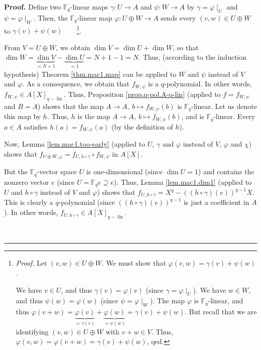 \documentclass[numbers=enddot,12pt,final,onecolumn,notitlepage]{scrartcl}%
\theoremstyle{definition}
\newenvironment{proof}[1][Proof]{\noindent\textbf{#1.} }{\ \rule{0.5em}{0.5em}}
\begin{document}
\begin{proof}
Define two $\mathbb{F}_{q}$-linear maps $\gamma:U\rightarrow A$ and
$\psi:W\rightarrow A$ by $\gamma=\varphi\mid_{U}$ and $\psi=\varphi\mid_{W}$.
Then, the $\mathbb{F}_{q}$-linear map $\varphi:U\oplus W\rightarrow A$ sends
every $\left(  v,w\right)  \in U\oplus W$ to $\gamma\left(  v\right)
+\psi\left(  w\right)  $\ \ \ \ \footnote{\textit{Proof.} Let $\left(
v,w\right)  \in U\oplus W$. We must show that $\varphi\left(  v,w\right)
=\gamma\left(  v\right)  +\psi\left(  w\right)  $.
\par
We have $v\in U$, and thus $\gamma\left(  v\right)  =\varphi\left(  v\right)
$ (since $\gamma=\varphi\mid_{U}$). We have $w\in W$, and thus $\psi\left(
w\right)  =\varphi\left(  w\right)  $ (since $\psi=\varphi\mid_{W}$). The map
$\varphi$ is $\mathbb{F}_{q}$-linear, and thus $\varphi\left(  v+w\right)
=\underbrace{\varphi\left(  v\right)  }_{=\gamma\left(  v\right)
}+\underbrace{\varphi\left(  w\right)  }_{=\psi\left(  w\right)  }%
=\gamma\left(  v\right)  +\psi\left(  w\right)  $. But recall that we are
identifying $\left(  v,w\right)  \in U\oplus W$ with $v+w\in V$. Thus,
$\varphi\left(  v,w\right)  =\varphi\left(  v+w\right)  =\gamma\left(
v\right)  +\psi\left(  w\right)  $, qed.}.

From $V=U\oplus W$, we obtain $\dim V=\dim U+\dim W$, so that $\dim
W=\underbrace{\dim V}_{=N+1}-\underbrace{\dim U}_{=1}=N+1-1=N$. Thus,
(according to the induction hypothesis) Theorem \ref{thm.mac1.map} can be
applied to $W$ and $\psi$ instead of $V$ and $\varphi$. As a consequence, we
obtain that $f_{W,\psi}$ is a $q$-polynomial. In other words, $f_{W,\psi}\in
A\left[  X\right]  _{q-\operatorname*{lin}}$. Thus, Proposition
\ref{prop.q-pol.A-q-lin} (applied to $f=f_{W,\psi}$ and $B=A$) shows that the
map $A\rightarrow A,\ b\mapsto f_{W,\psi}\left(  b\right)  $ is $\mathbb{F}%
_{q}$-linear. Let us denote this map by $h$. Thus, $h$ is the map
$A\rightarrow A,\ b\mapsto f_{W,\psi}\left(  b\right)  $, and is
$\mathbb{F}_{q}$-linear. Every $a\in A$ satisfies $h\left(  a\right)
=f_{W,\psi}\left(  a\right)  $ (by the definition of $h$).

Now, Lemma \ref{lem.mac1.too-early} (applied to $U$, $\gamma$ and $\varphi$
instead of $V$, $\varphi$ and $\chi$) shows that $f_{U\oplus W,\varphi
}=f_{U,h\circ\gamma}\circ f_{W,\psi}$ in $A\left[  X\right]  $.

But the $\mathbb{F}_{q}$-vector space $U$ is one-dimensional (since $\dim
U=1$) and contains the nonzero vector $e$ (since $U=\mathbb{F}_{q}e\supseteq
e$). Thus, Lemma \ref{lem.mac1.dim1} (applied to $U$ and $h\circ\gamma$
instead of $V$ and $\varphi$) shows that $f_{U,h\circ\gamma}=X^{q}-\left(
\left(  h\circ\gamma\right)  \left(  e\right)  \right)  ^{q-1}X$. This is
clearly a $q$-polynomial (since $\left(  \left(  h\circ\gamma\right)  \left(
e\right)  \right)  ^{q-1}$ is just a coefficient in $A$). In other words,
$f_{U,h\circ\gamma}\in A\left[  X\right]  _{q-\operatorname*{lin}}$.


\end{proof}
\end{document}
